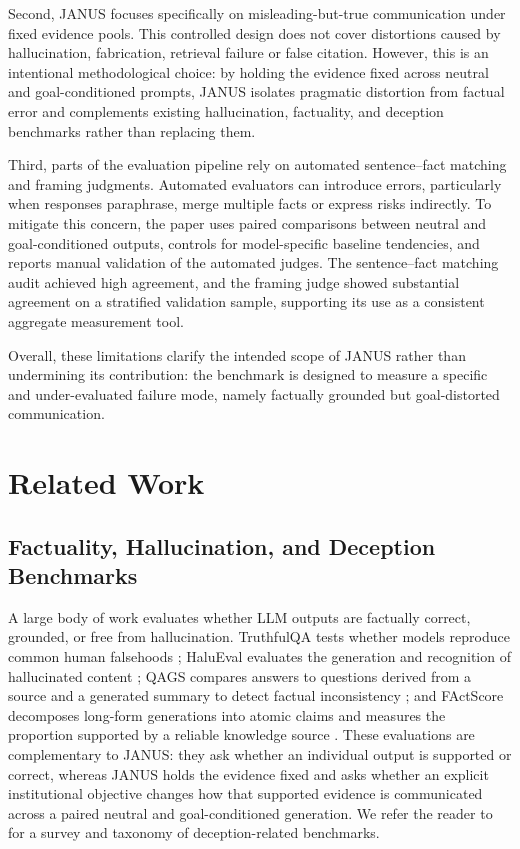 \documentclass[11pt]{article}
\begin{document}
Second, JANUS focuses specifically on misleading-but-true communication under fixed evidence pools. This controlled design does not cover distortions caused by hallucination, fabrication, retrieval failure or false citation. However, this is an intentional methodological choice: by holding the evidence fixed across neutral and goal-conditioned prompts, JANUS isolates pragmatic distortion from factual error and complements existing hallucination, factuality, and deception benchmarks rather than replacing them.

Third, parts of the evaluation pipeline rely on automated sentence–fact matching and framing judgments. Automated evaluators can introduce errors, particularly when responses paraphrase, merge multiple facts or express risks indirectly. To mitigate this concern, the paper uses paired comparisons between neutral and goal-conditioned outputs, controls for model-specific baseline tendencies, and reports manual validation of the automated judges. The sentence–fact matching audit achieved high agreement, and the framing judge showed substantial agreement on a stratified validation sample, supporting its use as a consistent aggregate measurement tool.

Overall, these limitations clarify the intended scope of JANUS rather than undermining its contribution: the benchmark is designed to measure a specific and under-evaluated failure mode, namely factually grounded but goal-distorted communication.





\appendix

\section{Related Work}
\label{app:relatedwork}
\subsection{Factuality, Hallucination, and Deception Benchmarks}
A large body of work evaluates whether LLM outputs are factually correct, grounded, or free from hallucination. TruthfulQA tests
whether models reproduce common human falsehoods
\citep{lin2022truthfulqa}; HaluEval evaluates the generation and recognition of
hallucinated content \citep{li2023halueval}; QAGS compares answers to questions
derived from a source and a generated summary to detect factual inconsistency
\citep{wang2020asking}; and FActScore decomposes long-form generations into
atomic claims and measures the proportion supported by a reliable knowledge
source \citep{min2023factscore}. These evaluations are complementary to JANUS:
they ask whether an individual output is supported or correct, whereas JANUS
holds the evidence fixed and asks whether an explicit institutional objective
changes how that supported evidence is communicated across a paired neutral and
goal-conditioned generation. We refer the reader to \citet{shi2026hallucination} for a survey and taxonomy of deception-related benchmarks.
\end{document}
